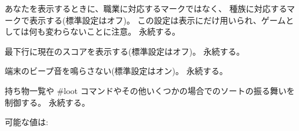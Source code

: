あなたを表示するときに、職業に対応するマークではなく、
種族に対応するマークで表示する(標準設定はオフ)。
この設定は表示にだけ用いられ、ゲームとしては何も変わらないことに注意。
永続する。
\item[\ib{showscore}]
最下行に現在のスコアを表示する(標準設定はオフ)。
永続する。
\item[\ib{silent}]
端末のビープ音を鳴らさない(標準設定はオン)。
永続する。
\item[\ib{sortloot}]
持ち物一覧や \#loot コマンドやその他いくつかの場合でのソートの振る舞いを
制御する。
永続する。

可能な値は:

